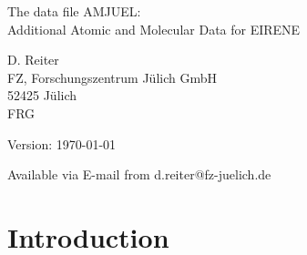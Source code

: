 \documentclass[12pt,dvips]{article}
\begin{document}
\parindent 0pt
{\LARGE \bf \center
\vspace*{3truecm}

The data file AMJUEL: \\
Additional Atomic and Molecular Data for EIRENE
\vspace*{3truecm}

D. Reiter \\
FZ, Forschungszentrum J\"ulich GmbH \\
52425 J\"ulich \\
FRG
\vspace{5truecm}

Version: \today
\vspace{3truecm}

Available via E-mail from d.reiter@fz-juelich.de
}
\tableofcontents
\newpage
\section*{Introduction}
\end{document}

